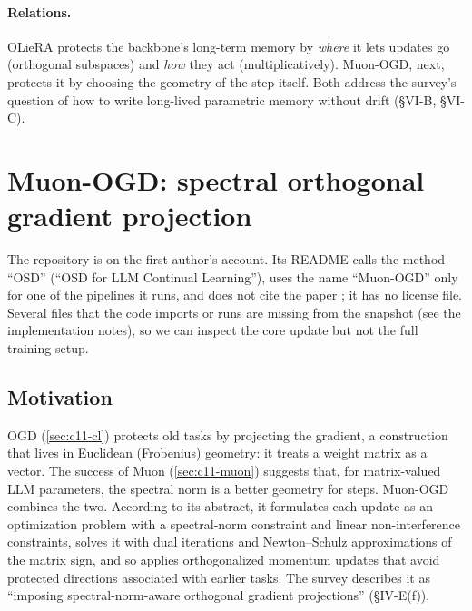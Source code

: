\paragraph{Relations.} OLieRA protects the backbone's long-term memory by \emph{where} it lets
updates go (orthogonal subspaces) and \emph{how} they act (multiplicatively). Muon-OGD, next,
protects it by choosing the geometry of the step itself. Both address the survey's question of
how to write long-lived parametric memory without drift (\S VI-B, \S VI-C).

\section{Muon-OGD: spectral orthogonal gradient projection}\label{sec:c11-muonogd}

\begin{pitfall}[title={Probably official, incomplete code}]
The repository  is on the first author's account. Its README calls the
method ``OSD'' (``OSD for LLM Continual Learning''), uses the name ``Muon-OGD'' only for one of
the pipelines it runs, and does not cite the paper \citep{lu2026muonogd}; it has no license
file. Several files that the code imports or runs are missing from the snapshot (see the
implementation notes), so we can inspect the core update but not the full training setup.
\end{pitfall}

\subsection{Motivation}\label{sec:c11-mo-motivation}

OGD (\cref{sec:c11-cl}) protects old tasks by projecting the gradient, a construction that lives
in Euclidean (Frobenius) geometry: it treats a weight matrix as a vector. The success of Muon
(\cref{sec:c11-muon}) suggests that, for matrix-valued LLM parameters, the spectral norm is a
better geometry for steps. Muon-OGD combines the two. According to its abstract, it formulates
each update as an optimization problem with a spectral-norm constraint and linear
non-interference constraints, solves it with dual iterations and Newton--Schulz approximations of
the matrix sign, and so applies orthogonalized momentum updates that avoid protected directions
associated with earlier tasks. The survey describes it as ``imposing spectral-norm-aware
orthogonal gradient projections'' (\S IV-E(f)).

